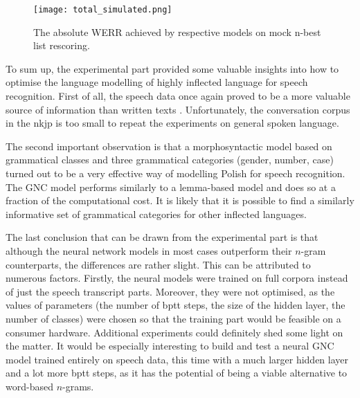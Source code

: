 \begin{figure}[!htbp]
	  \centering
	  \texttt{[image: total\_simulated.png]}
	  \caption[The absolute WERR achieved by respective models on mock n-best list rescoring]{The absolute WERR achieved by respective models on mock n-best list rescoring.}
	      \label{figure:total_mock}
\end{figure}

To sum up, the experimental part provided some valuable insights into how to optimise the language modelling of highly inflected language for speech recognition. First of all, the speech data once again proved to be a more valuable source of information than written texts \cite{dziadzio2015comparison}. Unfortunately, the conversation corpus in the \gls{nkjp} is too small to repeat the experiments on general spoken language. 

The second important observation is that a morphosyntactic model based on grammatical classes and three grammatical categories (gender, number, case) turned out to be a very effective way of modelling Polish for speech recognition. The GNC model performs similarly to a \mbox{lemma-based} model and does so at a fraction of the computational cost. It is likely that it is possible to find a similarly informative set of grammatical categories for other inflected languages. 

The last conclusion that can be drawn from the experimental part is that although the neural network models in most cases outperform their \mbox{$n$-gram} counterparts, the differences are rather slight. This can be attributed to numerous factors. Firstly, the neural models were trained on full corpora instead of just the speech transcript parts. Moreover, they were not optimised, as the values of parameters (the number of \gls{bptt} steps, the size of the hidden layer, the number of classes) were chosen so that the training part would be feasible on a consumer hardware. Additional experiments could definitely shed some light on the matter. It would be especially interesting to build and test a neural GNC model trained entirely on speech data, this time with a much larger hidden layer and a lot more \gls{bptt} steps, as it has the potential of being a viable alternative to \mbox{word-based} \mbox{$n$-grams}.

